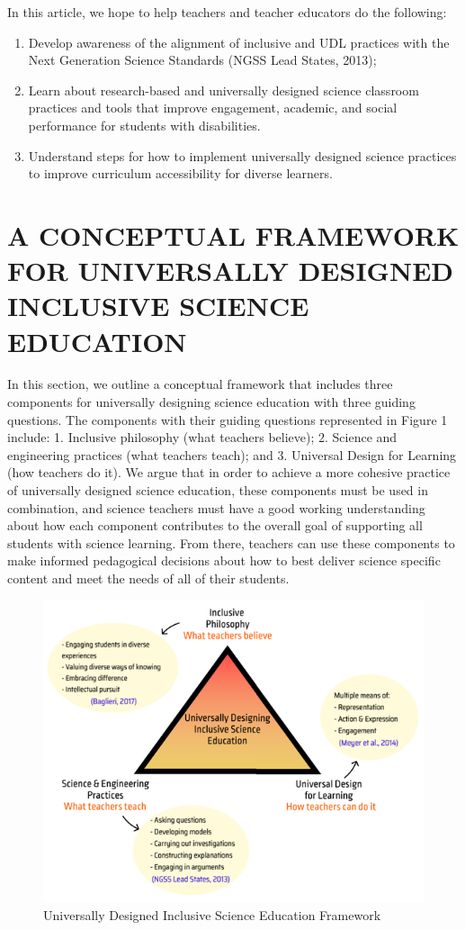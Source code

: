 \documentclass[11.5pt]{sig-alternate}
\begin{document}
\begin{large}
In this article, we hope to help teachers and teacher educators do the following: 
\begin{enumerate}[label=\alph*]
 \item Develop awareness of the alignment of inclusive and UDL practices with the Next Generation Science Standards (NGSS Lead States, 2013); 
    \item Learn about research-based and universally designed science classroom practices and tools that improve engagement, academic, and social performance for students with disabilities.
    \item Understand steps for how to implement universally designed science practices to improve curriculum accessibility for diverse learners. 
\end{enumerate}

\section*{A CONCEPTUAL FRAMEWORK FOR UNIVERSALLY DESIGNED INCLUSIVE SCIENCE EDUCATION}

In this section, we outline a conceptual framework that includes three components for universally designing science education with three guiding questions. The components with their guiding questions represented in Figure 1 include: 1. Inclusive philosophy (what teachers believe); 2. Science and engineering practices (what teachers teach); and 3. Universal Design for Learning (how teachers do it). We argue that in order to achieve a more cohesive practice of universally designed science education, these components must be used in combination, and science teachers must have a good working understanding about how each component contributes to the overall goal of supporting all students with science learning. From there, teachers can use these components to make informed pedagogical decisions about how to best deliver science specific content and meet the needs of all of their students.

\begin{figure}[t]
    \centering
    \includegraphics[width=1\linewidth]{fig1.png}
    \caption{Universally Designed Inclusive Science Education Framework}
\end{figure}


\end{large}
\end{document}
